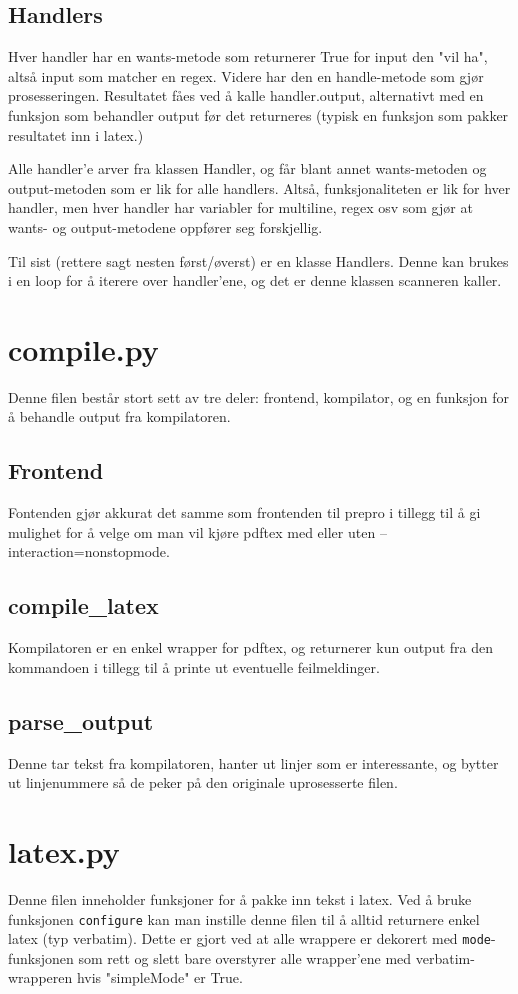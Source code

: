 \documentclass{article}
\newcommand{\code}[1]{\colorbox{codegray}{\texttt{#1}}}
\begin{document}
\subsection{Handlers}
Hver handler har en wants-metode som returnerer True for input den "vil ha",
altså input som matcher en regex. Videre har den en handle-metode som gjør
prosesseringen. Resultatet fåes ved å kalle handler.output, alternativt med
en funksjon som behandler output før det returneres (typisk en funksjon som
pakker resultatet inn i latex.)

Alle handler'e arver fra klassen Handler, og får blant annet wants-metoden
og output-metoden som er lik for alle handlers. Altså, funksjonaliteten er lik
for hver handler, men hver handler har variabler for multiline, regex osv
som gjør at wants- og output-metodene oppfører seg forskjellig.

Til sist (rettere sagt nesten først/øverst) er en klasse Handlers. Denne
kan brukes i en loop for å iterere over handler'ene, og det er denne klassen
scanneren kaller.


\section{compile.py}
Denne filen består stort sett av tre deler: frontend, kompilator, og en funksjon
for å behandle output fra kompilatoren.

\subsection{Frontend}
Fontenden gjør akkurat det samme som frontenden til prepro i tillegg til
å gi mulighet for å velge om man vil kjøre pdftex med eller uten --interaction=nonstopmode.

\subsection{compile\_latex}
Kompilatoren er en enkel wrapper for pdftex, og returnerer kun
output fra den kommandoen i tillegg til å printe ut eventuelle feilmeldinger.

\subsection{parse\_output}
Denne tar tekst fra kompilatoren, hanter ut linjer som er interessante,
og bytter ut linjenummere så de peker på den originale uprosesserte filen.


\section{latex.py}
Denne filen inneholder funksjoner for å pakke inn tekst i latex.
Ved å bruke funksjonen \code{configure} kan man instille denne filen til
å alltid returnere enkel latex (typ verbatim). Dette er gjort ved at
alle wrappere er dekorert med \code{mode}-funksjonen som rett og slett
bare overstyrer alle wrapper'ene med verbatim-wrapperen hvis "simpleMode"
er True.
\end{document}

